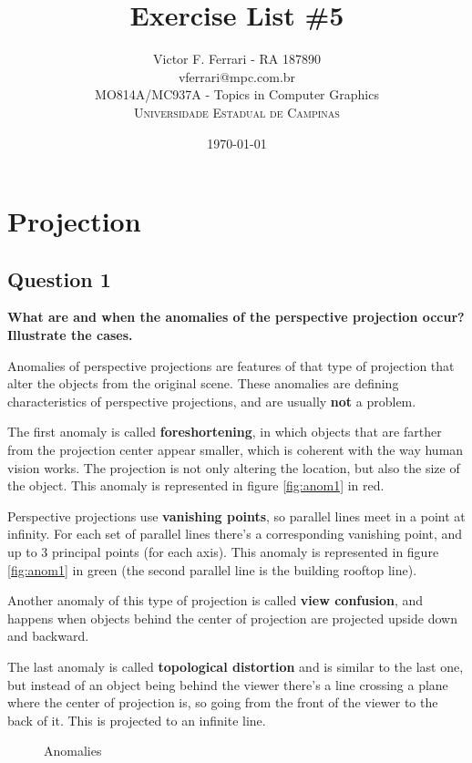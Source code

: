 \documentclass[12pt]{article}
\title{Exercise List \#5} %
\author{Victor F. Ferrari - RA 187890\\ %
vferrari@mpc.com.br\\
MO814A/MC937A - Topics in Computer Graphics\\ %
\textsc{Universidade Estadual de Campinas}
}
\date{\today} %
\begin{document}
\setlength{\droptitle}{-5em}    
\maketitle


\section{Projection}

\subsection*{Question 1}
{\bfseries What are and when the anomalies of the perspective projection occur? Illustrate the cases.}

Anomalies of perspective projections are features of that type of projection that alter the objects from the original scene. These anomalies are defining characteristics of perspective projections, and are usually \textbf{not} a problem.

The first anomaly is called \textbf{foreshortening}, in which objects that are farther from the projection center appear smaller, which is coherent with the way human vision works. The projection is not only altering the location, but also the size of the object. This anomaly is represented in figure \ref{fig:anom1} in red.

Perspective projections use \textbf{vanishing points}, so parallel lines meet in a point at infinity. For each set of parallel lines there's a corresponding vanishing point, and up to 3 principal points (for each axis). This anomaly is represented in figure \ref{fig:anom1} in green (the second parallel line is the building rooftop line).

Another anomaly of this type of projection is called \textbf{view confusion}, and happens when objects behind the center of projection are projected upside down and backward.

The last anomaly is called \textbf{topological distortion} and is similar to the last one, but instead of an object being behind the viewer there's a line crossing a plane where the center of projection is, so going from the front of the viewer to the back of it. This is projected to an infinite line.

\begin{figure}
    \centering
    \label{fig:anomalies}
    \caption{Anomalies}
\end{figure}
\end{document}
